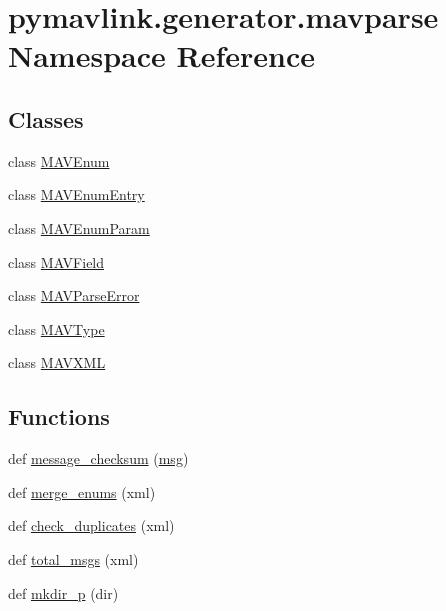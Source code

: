 \hypertarget{namespacepymavlink_1_1generator_1_1mavparse}{}\section{pymavlink.\+generator.\+mavparse Namespace Reference}
\label{namespacepymavlink_1_1generator_1_1mavparse}
\subsection*{Classes}
\begin{DoxyCompactItemize}
\item 
class \mbox{\hyperlink{classpymavlink_1_1generator_1_1mavparse_1_1MAVEnum}{M\+A\+V\+Enum}}
\item 
class \mbox{\hyperlink{classpymavlink_1_1generator_1_1mavparse_1_1MAVEnumEntry}{M\+A\+V\+Enum\+Entry}}
\item 
class \mbox{\hyperlink{classpymavlink_1_1generator_1_1mavparse_1_1MAVEnumParam}{M\+A\+V\+Enum\+Param}}
\item 
class \mbox{\hyperlink{classpymavlink_1_1generator_1_1mavparse_1_1MAVField}{M\+A\+V\+Field}}
\item 
class \mbox{\hyperlink{classpymavlink_1_1generator_1_1mavparse_1_1MAVParseError}{M\+A\+V\+Parse\+Error}}
\item 
class \mbox{\hyperlink{classpymavlink_1_1generator_1_1mavparse_1_1MAVType}{M\+A\+V\+Type}}
\item 
class \mbox{\hyperlink{classpymavlink_1_1generator_1_1mavparse_1_1MAVXML}{M\+A\+V\+X\+ML}}
\end{DoxyCompactItemize}
\subsection*{Functions}
\begin{DoxyCompactItemize}
\item 
def \mbox{\hyperlink{namespacepymavlink_1_1generator_1_1mavparse_aba7d09994f850b5dce98eb0356318543}{message\+\_\+checksum}} (\mbox{\hyperlink{stratnode_8cpp_a82cfe4ed9bc9e1b07c8bf209c324d85b}{msg}})
\item 
def \mbox{\hyperlink{namespacepymavlink_1_1generator_1_1mavparse_a7547b5a23ef0b60fac86a3dae099723b}{merge\+\_\+enums}} (xml)
\item 
def \mbox{\hyperlink{namespacepymavlink_1_1generator_1_1mavparse_aade73d992c7a3adb54e6ed2682ba97ce}{check\+\_\+duplicates}} (xml)
\item 
def \mbox{\hyperlink{namespacepymavlink_1_1generator_1_1mavparse_a7626b3a261c60c715fcce93281b0c5d0}{total\+\_\+msgs}} (xml)
\item 
def \mbox{\hyperlink{namespacepymavlink_1_1generator_1_1mavparse_aa0e41fa4aa5b31e62663f114f77de9a4}{mkdir\+\_\+p}} (dir)
\end{DoxyCompactItemize}
